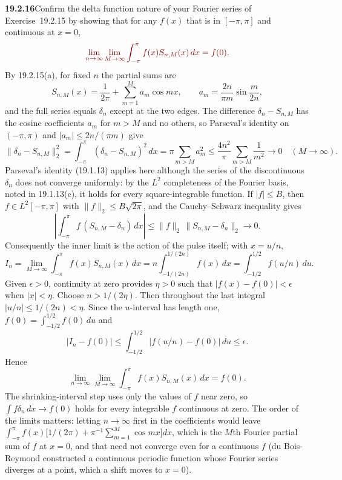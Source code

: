 \par\bigskip
\noindent\textbf{19.2.16}\quad Confirm the delta function nature of
your Fourier series of Exercise~19.2.15 by showing that for any
$f(x)$ that is  in $[-\pi,\pi]$ and continuous
at $x=0$,
\[
\erratum{\lim_{n\to\infty}\lim_{M\to\infty}
\int_{-\pi}^{\pi}f(x)S_{n,M}(x)\,dx=f(0).}
\]
\solution
{}
By 19.2.15(a), for fixed $n$ the partial sums are
\[
S_{n,M}(x)=\frac1{2\pi}+\sum_{m=1}^{M}a_m\cos mx,
\qquad a_m=\frac{2n}{\pi m}\sin\frac{m}{2n},
\]
and the full series equals $\delta_n$ except at the two edges. The
difference $\delta_n-S_{n,M}$ has the cosine coefficients $a_m$ for
$m>M$ and no others, so Parseval's identity on $(-\pi,\pi)$ and
$|a_m|\le2n/(\pi m)$ give
\[
\|\delta_n-S_{n,M}\|_2^2=\int_{-\pi}^{\pi}(\delta_n-S_{n,M})^2\,dx
=\pi\sum_{m>M}a_m^2\le\frac{4n^2}{\pi}\sum_{m>M}\frac1{m^2}
\longrightarrow0\quad(M\to\infty).
\]
Parseval's identity (19.1.13) applies here although the series of the
discontinuous $\delta_n$ does not converge uniformly: by the $L^2$
completeness of the Fourier basis, noted in 19.1.13(c), it holds for
every square-integrable function.
If $|f|\le B$, then $f\in L^2[-\pi,\pi]$ with $\|f\|_2\le B\sqrt{2\pi}$,
and the Cauchy--Schwarz inequality gives
\[
\left|\int_{-\pi}^{\pi}f\,(S_{n,M}-\delta_n)\,dx\right|
\le\|f\|_2\,\|S_{n,M}-\delta_n\|_2\longrightarrow0.
\]
Consequently the inner limit is the action of the pulse itself; with
$x=u/n$,
\[
I_n=\lim_{M\to\infty}\int_{-\pi}^{\pi}f(x)S_{n,M}(x)\,dx
=n\int_{-1/(2n)}^{1/(2n)}f(x)\,dx
=\int_{-1/2}^{1/2}f(u/n)\,du.
\]
Given $\epsilon>0$, continuity at zero provides $\eta>0$ such that
$|f(x)-f(0)|<\epsilon$ when $|x|<\eta$. Choose $n>1/(2\eta)$.
Then throughout the last integral $|u/n|\le1/(2n)<\eta$. Since the
$u$-interval has length one, $f(0)=\int_{-1/2}^{1/2}f(0)\,du$ and
\[
|I_n-f(0)|
\le\int_{-1/2}^{1/2}|f(u/n)-f(0)|\,du\le\epsilon.
\]
Hence
\[
\boxed{\lim_{n\to\infty}\lim_{M\to\infty}
\int_{-\pi}^{\pi}f(x)S_{n,M}(x)\,dx=f(0).}
\]
The shrinking-interval step uses only the values of $f$ near zero, so
$\int f\delta_n\,dx\to f(0)$ holds for every integrable $f$ continuous
at zero. The order of the limits matters: letting $n\to\infty$ first in
the coefficients would leave
$\int_{-\pi}^{\pi}f(x)\bigl[1/(2\pi)+\pi^{-1}\sum_{m=1}^M\cos mx\bigr]dx$,
which is the $M$th Fourier partial sum of $f$ at $x=0$, and that need
not converge even for a continuous $f$ (du Bois-Reymond constructed a
continuous periodic function whose Fourier series diverges at a point,
which a shift moves to $x=0$).

